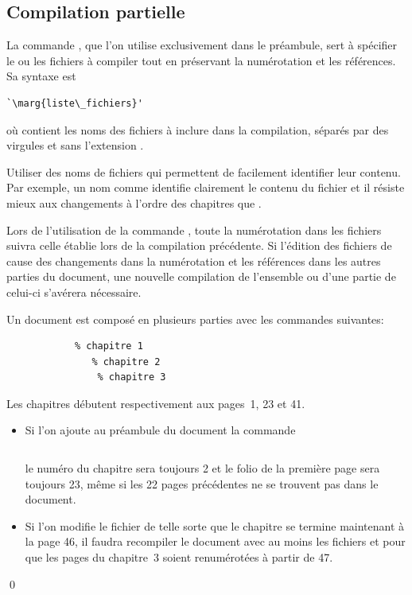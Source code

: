 \subsection{Compilation partielle}
\label{sec:organisation:include:compilation}

La commande \cmd{}, que l'on utilise exclusivement dans le
préambule, sert à spécifier le ou les fichiers à compiler tout en
préservant la numérotation et les références. Sa syntaxe est
\begin{lstlisting}
`\marg{liste\_fichiers}'
\end{lstlisting}
où  contient les noms des fichiers à
inclure dans la compilation, séparés par des virgules et sans
l'extension .

\begin{conseil}
  Utiliser des noms de fichiers qui permettent de facilement
  identifier leur contenu. Par exemple, un nom comme
   identifie clairement le contenu du fichier et
  il résiste mieux aux changements à l'ordre des chapitres que
  .
\end{conseil}

Lors de l'utilisation de la commande \cmd{}, toute la
numérotation dans les fichiers  suivra celle
établie lors de la compilation précédente. Si l'édition des fichiers
de  cause des changements dans la numérotation
et les références dans les autres parties du document, une nouvelle
compilation de l'ensemble ou d'une partie de celui-ci s'avérera
nécessaire.

\begin{exemple}
  Un document est composé en plusieurs parties avec les commandes
  suivantes:
\begin{lstlisting}
            % chapitre 1
               % chapitre 2
                % chapitre 3
\end{lstlisting}
  Les chapitres débutent respectivement aux pages~1, 23 et 41.
  \begin{itemize}
  \item Si l'on ajoute au préambule du document la commande
\begin{lstlisting}

\end{lstlisting}
    le numéro du chapitre sera toujours 2 et le folio de
    la première page sera toujours 23, même si les 22 pages
    précédentes ne se trouvent pas dans le document.
  \item Si l'on modifie le fichier  de telle
    sorte que le chapitre se termine maintenant à la page 46, il
    faudra recompiler le document avec au moins les fichiers
     et  pour que les pages du
    chapitre~3 soient renumérotées à partir de 47.
  \end{itemize}
  \qed
\end{exemple}

